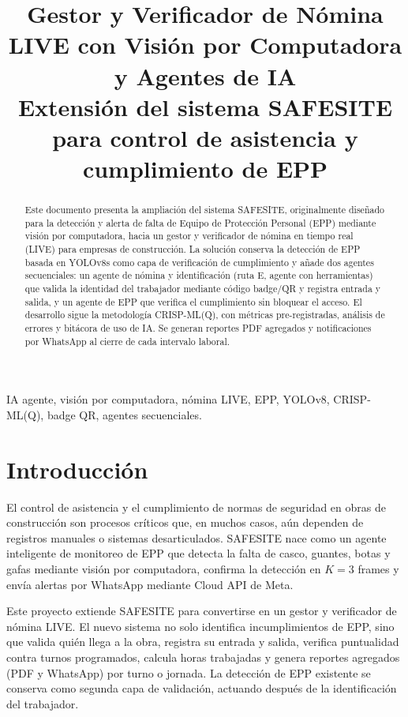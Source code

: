 \documentclass[conference,spanish]{IEEEtran}
\title{Gestor y Verificador de Nómina LIVE con Visión por Computadora y Agentes de IA\\
\small Extensión del sistema SAFESITE para control de asistencia y cumplimiento de EPP}
\author{
\IEEEauthorblockN{William David Lozano Julio}
\IEEEauthorblockA{\textit{Ingeniería de Sistemas}\\
Código: T00078475\\
Universidad de Cartagena}
\and
\IEEEauthorblockN{Cristian Mateo Benítez}
\IEEEauthorblockA{\textit{Ingeniería de Sistemas}\\
Código: T000XXXX\\
Universidad de Cartagena}
}
\date{}
\begin{document}
\maketitle

\begin{abstract}
Este documento presenta la ampliación del sistema SAFESITE, originalmente diseñado para la detección y alerta de falta de Equipo de Protección Personal (EPP) mediante visión por computadora, hacia un gestor y verificador de nómina en tiempo real (LIVE) para empresas de construcción. La solución conserva la detección de EPP basada en YOLOv8s como capa de verificación de cumplimiento y añade dos agentes secuenciales: un agente de nómina y identificación (ruta E, agente con herramientas) que valida la identidad del trabajador mediante código badge/QR y registra entrada y salida, y un agente de EPP que verifica el cumplimiento sin bloquear el acceso. El desarrollo sigue la metodología CRISP-ML(Q), con métricas pre-registradas, análisis de errores y bitácora de uso de IA. Se generan reportes PDF agregados y notificaciones por WhatsApp al cierre de cada intervalo laboral.
\end{abstract}

\begin{IEEEkeywords}
IA agente, visión por computadora, nómina LIVE, EPP, YOLOv8, CRISP-ML(Q), badge QR, agentes secuenciales.
\end{IEEEkeywords}

\section{Introducción}
El control de asistencia y el cumplimiento de normas de seguridad en obras de construcción son procesos críticos que, en muchos casos, aún dependen de registros manuales o sistemas desarticulados. SAFESITE nace como un agente inteligente de monitoreo de EPP que detecta la falta de casco, guantes, botas y gafas mediante visión por computadora, confirma la detección en $K=3$ frames y envía alertas por WhatsApp mediante Cloud API de Meta.

Este proyecto extiende SAFESITE para convertirse en un gestor y verificador de nómina LIVE. El nuevo sistema no solo identifica incumplimientos de EPP, sino que valida quién llega a la obra, registra su entrada y salida, verifica puntualidad contra turnos programados, calcula horas trabajadas y genera reportes agregados (PDF y WhatsApp) por turno o jornada. La detección de EPP existente se conserva como segunda capa de validación, actuando después de la identificación del trabajador.
\end{document}
